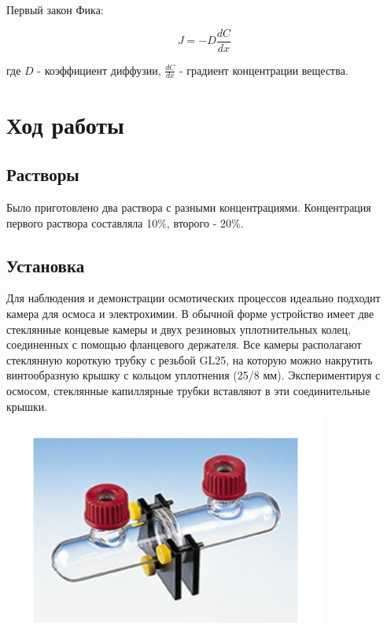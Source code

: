 \documentclass{article}
\begin{document}
            \begin{center}
                Первый закон Фика:

                \begin{equation}
                    J = -D\frac{dC}{dx}    
                \end{equation}
            \end{center}
            
            где $D$ - коэффициент диффузии, $\frac{dC}{dx}$ - градиент концентрации
            вещества. \\

    \newpage
    \section*{Ход работы}

        \subsection*{Растворы}
            \hspace*{4mm}Было приготовлено два раствора  с разными концентрациями.
            Концентрация первого раствора составляла 10\%, второго - 20\%.


        \subsection*{Установка}
            \hspace*{4mm}Для наблюдения и демонстрации осмотических процессов идеально
            подходит камера для осмоса и электрохимии. В обычной форме
            устройство имеет две стеклянные концевые камеры и двух резиновых
            уплотнительных колец, соединенных с помощью фланцевого держателя. Все
            камеры располагают стеклянную короткую трубку с резьбой GL25, на которую
            можно накрутить винтообразную крышку с кольцом уплотнения (25/8 мм).
            Экспериментируя с осмосом, стеклянные капиллярные трубки вставляют в эти
            соединительные крышки. \\
        
            \includegraphics*[width=0.8\textwidth]{tools1.png} \\
\end{document}
